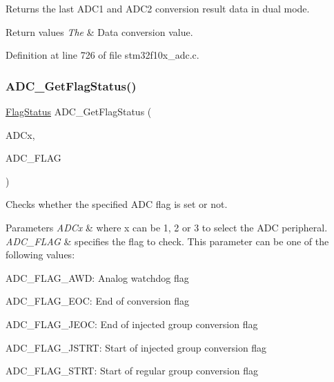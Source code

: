 Returns the last A\+D\+C1 and A\+D\+C2 conversion result data in dual mode. 


\begin{DoxyRetVals}{Return values}
{\em The} & Data conversion value. \\
\hline
\end{DoxyRetVals}


Definition at line 726 of file stm32f10x\+\_\+adc.\+c.

\mbox{\label{group___a_d_c___private___functions_gaa12546e51ec905c90a3aada432bd4633}} 
\subsubsection{\texorpdfstring{A\+D\+C\+\_\+\+Get\+Flag\+Status()}{ADC\_GetFlagStatus()}}
{\footnotesize\ttfamily \hyperlink{group___exported__types_ga89136caac2e14c55151f527ac02daaff}{Flag\+Status} A\+D\+C\+\_\+\+Get\+Flag\+Status (\begin{DoxyParamCaption}\item[{\hyperlink{struct_a_d_c___type_def}{A\+D\+C\+\_\+\+Type\+Def} $\ast$}]{A\+D\+Cx,  }\item[{uint8\+\_\+t}]{A\+D\+C\+\_\+\+F\+L\+AG }\end{DoxyParamCaption})}



Checks whether the specified A\+DC flag is set or not. 


\begin{DoxyParams}{Parameters}
{\em A\+D\+Cx} & where x can be 1, 2 or 3 to select the A\+DC peripheral. \\
\hline
{\em A\+D\+C\+\_\+\+F\+L\+AG} & specifies the flag to check. This parameter can be one of the following values\+: \begin{DoxyItemize}
\item A\+D\+C\+\_\+\+F\+L\+A\+G\+\_\+\+A\+WD\+: Analog watchdog flag \item A\+D\+C\+\_\+\+F\+L\+A\+G\+\_\+\+E\+OC\+: End of conversion flag \item A\+D\+C\+\_\+\+F\+L\+A\+G\+\_\+\+J\+E\+OC\+: End of injected group conversion flag \item A\+D\+C\+\_\+\+F\+L\+A\+G\+\_\+\+J\+S\+T\+RT\+: Start of injected group conversion flag \item A\+D\+C\+\_\+\+F\+L\+A\+G\+\_\+\+S\+T\+RT\+: Start of regular group conversion flag \end{DoxyItemize}
\\
\hline
\end{DoxyParams}

